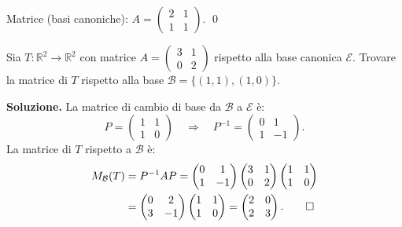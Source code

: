 Matrice (basi canoniche): $A = \begin{pmatrix} 2 & 1 \\ 1 & 1 \end{pmatrix}$. \qed

\medskip

\begin{examplebox}
Sia $T \colon \mathbb{R}^2 \to \mathbb{R}^2$ con matrice $A = \begin{pmatrix} 3 & 1 \\ 0 & 2 \end{pmatrix}$ rispetto alla base canonica $\mathcal{E}$. Trovare la matrice di $T$ rispetto alla base $\mathcal{B} = \{(1,1), (1,0)\}$.
\end{examplebox}

\textbf{Soluzione.} La matrice di cambio di base da $\mathcal{B}$ a $\mathcal{E}$ è:
\[ P = \begin{pmatrix} 1 & 1 \\ 1 & 0 \end{pmatrix} \quad \Longrightarrow \quad P^{-1} = \begin{pmatrix} 0 & 1 \\ 1 & -1 \end{pmatrix}. \]
La matrice di $T$ rispetto a $\mathcal{B}$ è:
\begin{align*}
    M_{\mathcal{B}}(T) &= P^{-1}AP = \begin{pmatrix} 0 & 1 \\ 1 & -1 \end{pmatrix}\begin{pmatrix} 3 & 1 \\ 0 & 2 \end{pmatrix}\begin{pmatrix} 1 & 1 \\ 1 & 0 \end{pmatrix} \\
    &= \begin{pmatrix} 0 & 2 \\ 3 & -1 \end{pmatrix}\begin{pmatrix} 1 & 1 \\ 1 & 0 \end{pmatrix} = \begin{pmatrix} 2 & 0 \\ 2 & 3 \end{pmatrix}. \qed
\end{align*}

